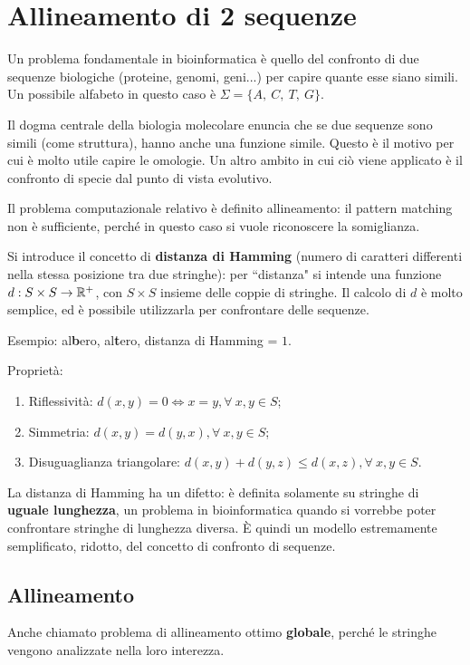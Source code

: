 \newpage
\section{Allineamento di 2 sequenze}
Un problema fondamentale in bioinformatica è quello del confronto di due sequenze biologiche (proteine, genomi, geni...) per capire quante esse siano simili. Un possibile alfabeto in questo caso è $\Sigma = \{A,\ C,\ T,\ G\}$.

Il dogma centrale della biologia molecolare enuncia che se due sequenze sono simili (come struttura), hanno anche una funzione simile. Questo è il motivo per cui è molto utile capire le omologie. Un altro ambito in cui ciò viene applicato è il confronto di specie dal punto di vista evolutivo.

Il problema computazionale relativo è definito allineamento: il pattern matching non è sufficiente, perché in questo caso si vuole riconoscere la somiglianza.

Si introduce il concetto di \textbf{distanza di Hamming} (numero di caratteri differenti nella stessa posizione tra due stringhe): per ``distanza" si intende una funzione $d : S \times S \rightarrow \mathbb{R}^+$, con $S \times S$ insieme delle coppie di stringhe. Il calcolo di $d$ è molto semplice, ed è possibile utilizzarla per confrontare delle sequenze. 

Esempio: al\textbf{b}ero, al\textbf{t}ero, distanza di Hamming = $1$.

Proprietà: 
\begin{enumerate}
	\item Riflessività: $d(x, y) = 0 \Leftrightarrow x = y, \forall\ x, y \in S$;
	\item Simmetria: $d(x, y) = d(y, x), \forall\ x, y \in S$;
	\item Disuguaglianza triangolare: $d(x, y) + d(y, z) \leq d(x, z), \forall\ x, y \in S$.
\end{enumerate}

La distanza di Hamming ha un difetto: è definita solamente su stringhe di \textbf{uguale lunghezza}, un problema in bioinformatica quando si vorrebbe poter confrontare stringhe di lunghezza diversa. È quindi un modello estremamente semplificato, ridotto, del concetto di confronto di sequenze.

\subsection{Allineamento}
Anche chiamato problema di allineamento ottimo \textbf{globale}, perché le stringhe vengono analizzate nella loro interezza.

